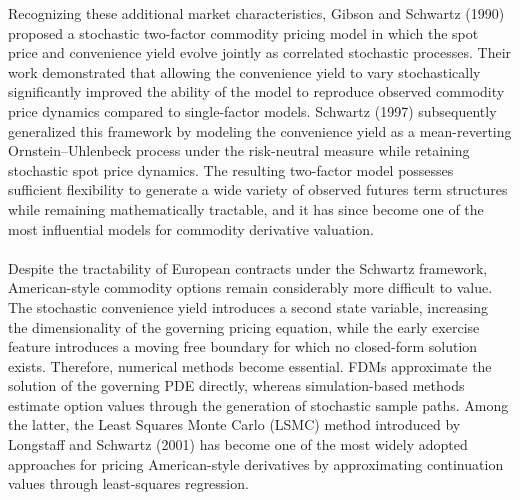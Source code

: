 \documentclass[12pt,a4paper]{article}
\begin{document}
Recognizing these additional market characteristics, Gibson and Schwartz (1990) proposed a stochastic two-factor commodity pricing model in which the spot price and convenience yield evolve jointly as correlated stochastic processes. Their work demonstrated that allowing the convenience yield to vary stochastically significantly improved the ability of the model to reproduce observed commodity price dynamics compared to single-factor models. Schwartz (1997) subsequently generalized this framework by modeling the convenience yield as a mean-reverting Ornstein--Uhlenbeck process under the risk-neutral measure while retaining stochastic spot price dynamics. The resulting two-factor model possesses sufficient flexibility to generate a wide variety of observed futures term structures while remaining mathematically tractable, and it has since become one of the most influential models for commodity derivative valuation.\\\\
Despite the tractability of European contracts under the Schwartz framework, American-style commodity options remain considerably more difficult to value. The stochastic convenience yield introduces a second state variable, increasing the dimensionality of the governing pricing equation, while the early exercise feature introduces a moving free boundary for which no closed-form solution exists. Therefore, numerical methods become essential. FDMs approximate the solution of the governing PDE directly, whereas simulation-based methods estimate option values through the generation of stochastic sample paths. Among the latter, the Least Squares Monte Carlo (LSMC) method introduced by Longstaff and Schwartz (2001) has become one of the most widely adopted approaches for pricing American-style derivatives by approximating continuation values through least-squares regression.\\\\
\end{document}
